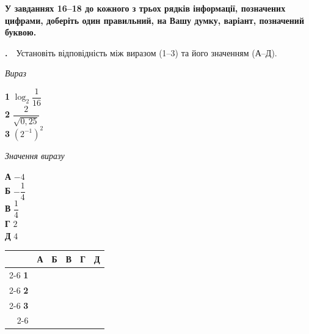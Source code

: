 \documentclass[12pt]{article}
\newcommand{\instructionBox}[1]{%
\par\vspace{0.3cm}
\begin{tcolorbox}[colback=instrBg, colframe=instrBorder, boxrule=0.6pt, arc=2pt,
    left=8pt, right=8pt, top=4pt, bottom=4pt]
\centering\small\bfseries #1
\end{tcolorbox}
\par\vspace{0.15cm}
}
\newcommand{\matchingGrid}{%
    \begingroup
    \renewcommand{\arraystretch}{1.15}
    \setlength{\tabcolsep}{4pt}
    \footnotesize
    \begin{tabular}{r|c|c|c|c|c|}
         \multicolumn{1}{c}{} & \multicolumn{1}{c}{\textbf{А}} & \multicolumn{1}{c}{\textbf{Б}} & \multicolumn{1}{c}{\textbf{В}} & \multicolumn{1}{c}{\textbf{Г}} & \multicolumn{1}{c}{\textbf{Д}} \\ \cline{2-6}
         \textbf{1} & \phantom{X} & \phantom{X} & \phantom{X} & \phantom{X} & \phantom{X} \\ \cline{2-6}
         \textbf{2} & & & & & \\ \cline{2-6}
         \textbf{3} & & & & & \\ \cline{2-6}
    \end{tabular}
    \endgroup
}
\newcounter{zad}
\newcommand{\zadtask}[1]{\stepcounter{zad}\par\vspace{0.3cm}\noindent\textbf{\thezad.}\ \ #1\par\vspace{0.2cm}}
\begin{document}
\newpage

\instructionBox{У завданнях 16--18 до кожного з трьох рядків інформації, позначених цифрами, доберіть один правильний, на Вашу думку, варіант, позначений буквою.}

\zadtask{Установіть відповідність між виразом (1--3) та його значенням (А--Д).\par
\vspace{0.3cm}
\noindent
\begin{minipage}[t]{0.45\textwidth}
\textit{Вираз}\par\vspace{0.15cm}
\textbf{1} \quad $\log_2 \dfrac{1}{16}$\\[0.3cm]
\textbf{2} \quad $\dfrac{2}{\sqrt{0{,}25}}$\\[0.3cm]
\textbf{3} \quad $(2^{-1})^2$
\end{minipage}%
\hfill
\begin{minipage}[t]{0.3\textwidth}
\textit{Значення виразу}\par\vspace{0.15cm}
\textbf{А} \quad $-4$\\[0.15cm]
\textbf{Б} \quad $-\dfrac{1}{4}$\\[0.15cm]
\textbf{В} \quad $\dfrac{1}{4}$\\[0.15cm]
\textbf{Г} \quad $2$\\[0.15cm]
\textbf{Д} \quad $4$
\end{minipage}%
\hfill
\begin{minipage}[t]{0.2\textwidth}
\vspace{0.4cm}
\begin{flushright}\matchingGrid\end{flushright}
\end{minipage}}
\end{document}
